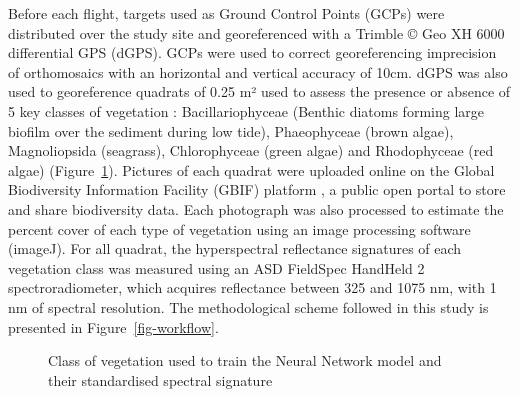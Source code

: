 \documentclass[
  number]{elsarticle}
\begin{document}
Before each flight, targets used as Ground Control Points (GCPs) were
distributed over the study site and georeferenced with a Trimble © Geo
XH 6000 differential GPS (dGPS). GCPs were used to correct
georeferencing imprecision of orthomosaics with an horizontal and
vertical accuracy of 10cm. dGPS was also used to georeference quadrats
of 0.25 m² used to assess the presence or absence of 5 key classes of
vegetation : Bacillariophyceae (Benthic diatoms forming large biofilm
over the sediment during low tide), Phaeophyceae (brown algae),
Magnoliopsida (seagrass), Chlorophyceae (green algae) and Rhodophyceae
(red algae) (Figure~\ref{fig-vegetation}). Pictures of each quadrat were
uploaded online on the Global Biodiversity Information Facility (GBIF)
platform \citep{BedeGbif}, a public open portal to store and share
biodiversity data. Each photograph was also processed to estimate the
percent cover of each type of vegetation using an image processing
software (imageJ). For all quadrat, the hyperspectral reflectance
signatures of each vegetation class was measured using an ASD FieldSpec
HandHeld 2 spectroradiometer, which acquires reflectance between 325 and
1075 nm, with 1 nm of spectral resolution. The methodological scheme
followed in this study is presented in Figure~\ref{fig-workflow}.

\label{cell-fig-vegetation}
\begin{figure}[H]


\caption{\label{fig-vegetation}Class of vegetation used to train the
Neural Network model and their standardised spectral signature}

\end{figure}%
\end{document}
